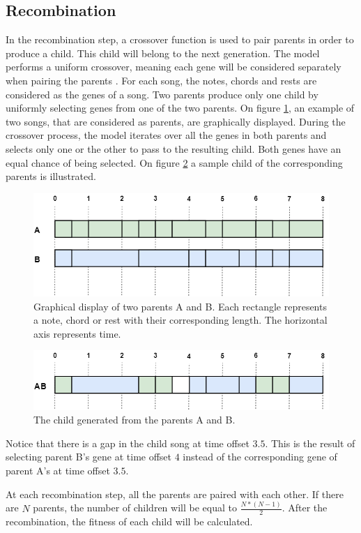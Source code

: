 \subsection{Recombination}
In the recombination step, a crossover function is used to pair parents in order to produce a child. This child will belong to the next generation. The model performs a uniform crossover, meaning each gene will be considered separately when pairing the parents \cite{BOOK:GA}. For each song, the notes, chords and rests are considered as the genes of a song. Two parents produce only one child by uniformly selecting genes from one of the two parents. 
On figure \ref{fig:cross_init}, an example of two songs, that are considered as parents, are graphically displayed. During the crossover process, the model iterates over all the genes in both parents and selects only one or the other to pass to the resulting child. Both genes have an equal chance of being selected. On figure \ref{fig:cross_7} a sample child of the corresponding parents is illustrated.
\begin{figure}[H]
    \includegraphics[width=\linewidth]{Fotos/crossover/init.png}
	\caption{Graphical display of two parents A and B. Each rectangle represents a note, chord or rest with their corresponding length. The horizontal axis represents time.}
	\label{fig:cross_init}
\end{figure}
\begin{figure}[H]
\includegraphics[width=\linewidth]{Fotos/crossover/last.png}
\caption{The child generated from the parents A and B.}
\label{fig:cross_7}
\end{figure}
Notice that there is a gap in the child song at time offset $3.5$. This is the result of selecting parent B's gene at time offset $4$ instead of the corresponding gene of parent A's at time offset $3.5$. 

At each recombination step, all the parents are paired with each other. If there are \(N\) parents, the number of children will be equal to \( \frac{N * (N-1)}{2} \). After the recombination, the fitness of each child will be calculated.